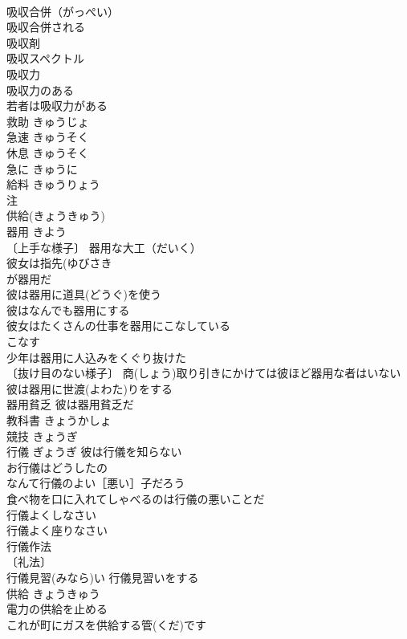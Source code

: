\documentclass[8pt]{extreport}
\begin{document}
\begin{CJK}{UTF8}{min}
\\	吸収合併（がっぺい） 
\\	吸収合併される 
\\	吸収剤 
\\	吸収スペクトル 
\\	吸収力 
\\	吸収力のある 
\\	若者は吸収力がある 
\\	救助	きゅうじょ	
\\	急速	きゅうそく	
\\	休息	きゅうそく	
\\	急に	きゅうに	
\\	給料	きゅうりょう	
\\	注　
\\	供給(きょうきゅう)　
\\	器用	きよう	
\\	〔上手な様子〕 器用な大工（だいく） 
\\	彼女は指先(ゆびさき
\\	が器用だ 
\\	彼は器用に道具(どうぐ)を使う 
\\	彼はなんでも器用にする 
\\	彼女はたくさんの仕事を器用にこなしている 
\\	こなす　
\\	少年は器用に人込みをくぐり抜けた 
\\	〔抜け目のない様子〕 商(しょう)取り引きにかけては彼ほど器用な者はいない 
\\	彼は器用に世渡(よわた)りをする 
\\	器用貧乏 彼は器用貧乏だ 
\\	教科書	きょうかしょ	
\\	競技	きょうぎ	
\\	行儀	ぎょうぎ	彼は行儀を知らない 
\\	お行儀はどうしたの 
\\	なんて行儀のよい［悪い］子だろう 
\\	食べ物を口に入れてしゃべるのは行儀の悪いことだ 
\\	行儀よくしなさい 
\\	行儀よく座りなさい 
\\	行儀作法 
\\	〔礼法〕
\\	行儀見習(みなら)い 行儀見習いをする 
\\	供給	きょうきゅう	
\\	電力の供給を止める 
\\	これが町にガスを供給する管(くだ)です 

\end{CJK}
\end{document}
